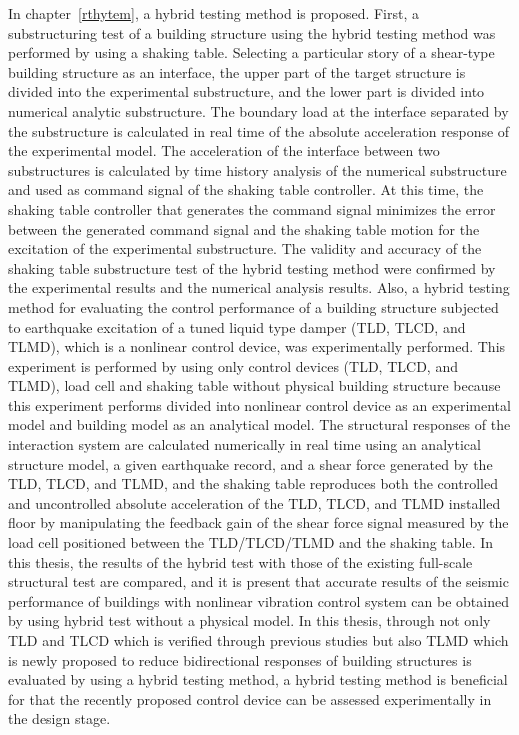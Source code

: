 In chapter~\ref{rthytem}, a hybrid testing method is proposed. First, a substructuring test of a building structure using the hybrid testing method was performed by using a shaking table. Selecting a particular story of a shear-type building structure as an interface, the upper part of the target structure is divided into the experimental substructure, and the lower part is divided into numerical analytic substructure. The boundary load at the interface separated by the substructure is calculated in real time of the absolute acceleration response of the experimental model. The acceleration of the interface between two substructures is calculated by time history analysis of the numerical substructure and used as command signal of the shaking table controller. At this time, the shaking table controller that generates the command signal minimizes the error between the generated command signal and the shaking table motion for the excitation of the experimental substructure. The validity and accuracy of the shaking table substructure test of the hybrid testing method were confirmed by the experimental results and the numerical analysis results. Also, a hybrid testing method for evaluating the control performance of a building structure subjected to earthquake excitation of a tuned liquid type damper (TLD, TLCD, and TLMD), which is a nonlinear control device, was experimentally performed. This experiment is performed by using only control devices (TLD, TLCD, and TLMD), load cell and shaking table without physical building structure because this experiment performs divided into nonlinear control device as an experimental model and building model as an analytical model. The structural responses of the interaction system are calculated numerically in real time using an analytical structure model, a given earthquake record, and a shear force generated by the TLD, TLCD, and TLMD, and the shaking table reproduces both the controlled and uncontrolled absolute acceleration of the TLD, TLCD, and TLMD installed floor by manipulating the feedback gain of the shear force signal measured by the load cell positioned between the TLD/TLCD/TLMD and the shaking table. In this thesis, the results of the hybrid test with those of the existing full-scale structural test are compared, and it is present that accurate results of the seismic performance of buildings with nonlinear vibration control system can be obtained by using hybrid test without a physical model. In this thesis, through not only TLD and TLCD which is verified through previous studies but also TLMD which is newly proposed to reduce bidirectional responses of building structures is evaluated by using a hybrid testing method, a hybrid testing method is beneficial for that the recently proposed control device can be assessed experimentally in the design stage.

